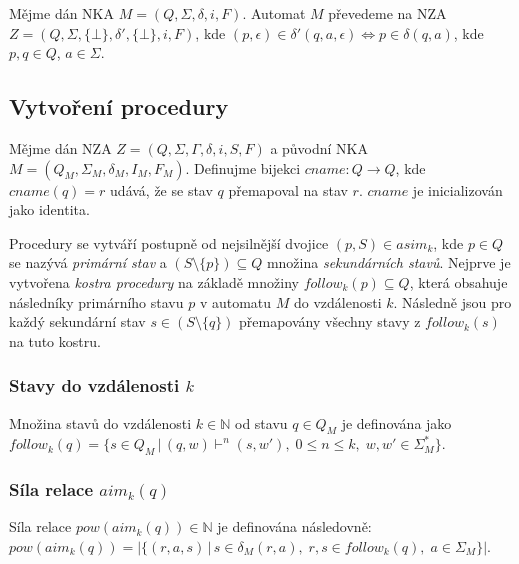         Mějme dán NKA $M = (Q, \Sigma, \delta, i, F)$. Automat $M$ převedeme na NZA $Z = (Q, \Sigma, \{\bot\}, \delta' , \{\bot\},i, F)$, kde $(p, \epsilon) \in \delta'(q, a, \epsilon) \iff p \in \delta(q, a)$, kde $p, q \in Q$, $a \in \Sigma$.

    \subsection{Vytvoření procedury}
        Mějme dán NZA $Z = (Q, \Sigma, \Gamma, \delta, i, S, F)$ a původní NKA $M = (Q_M, \Sigma_M, \delta_M , I_M, F_M)$. Definujme bijekci $cname : Q \rightarrow Q$, kde $cname(q) = r$ udává, že se stav $q$ přemapoval na stav $r$. $cname$ je inicializován jako identita.

        Procedury se vytváří postupně od nejsilnější dvojice $ (p, S) \in asim_k$, kde $p \in Q$ se nazývá \textit{primární stav} a $(S \setminus \{p\}) \subseteq Q$ množina \textit{sekundárních stavů}. Nejprve je vytvořena \textit{kostra procedury} na základě množiny $follow_k(p) \subseteq Q$, která obsahuje následníky primárního stavu $p$ v automatu $M$ do vzdálenosti $k$. Následně jsou pro každý sekundární stav $s \in (S \setminus \{q\})$ přemapovány všechny stavy z $follow_k(s)$ na tuto kostru.

        \subsubsection*{Stavy do vzdálenosti $k$}
            Množina stavů do vzdálenosti $k \in \mathbb{N}$ od stavu $q \in Q_M$ je definována jako $follow_k(q) = \{s \in Q_M\, |\, (q, w) \vdash^n (s, w'),\; 0 \leq n \leq k,\; w, w' \in \Sigma^*_M\}$.

        \subsubsection*{Síla relace $aim_k(q)$}
            Síla relace $pow(aim_k(q)) \in \mathbb{N}$ je definována následovně: $pow(aim_k(q)) = |\{(r, a, s) \,|\, s \in \delta_M (r, a),\; r, s \in follow_k(q),\; a \in \Sigma_M\}|$.

